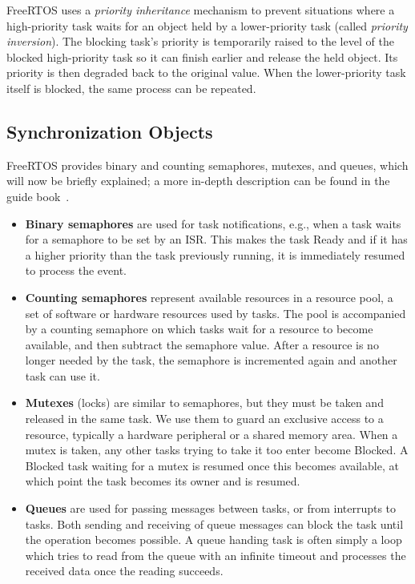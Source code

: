 FreeRTOS uses a \textit{priority inheritance} mechanism to prevent situations where a high-priority task waits for an object held by a lower-priority task (called \textit{priority inversion}). The blocking task's priority is temporarily raised to the level of the blocked high-priority task so it can finish earlier and release the held object. Its priority is then degraded back to the original value. When the lower-priority task itself is blocked, the same process can be repeated.

\subsection{Synchronization Objects}

FreeRTOS provides binary and counting semaphores, mutexes, and queues, which will now be briefly explained; a more in-depth description can be found in the guide book~\cite{freertos-book}.

\begin{itemize}
	\item \textbf{Binary semaphores} are used for task notifications, e.g., when a task waits for a semaphore to be set by an \gls{ISR}. This makes the task Ready and if it has a higher priority than the task previously running, it is immediately resumed to process the event.

	\item  \textbf{Counting semaphores} represent available resources in a resource pool, a set of software or hardware resources used by tasks. The pool is accompanied by a counting semaphore on which tasks wait for a resource to become available, and then subtract the semaphore value. After a resource is no longer needed by the task, the semaphore is incremented again and another task can use it.

	\item \textbf{Mutexes} (locks) are similar to semaphores, but they must be taken and released in the same task. We use them to
	guard an exclusive access to a resource, typically a hardware peripheral or a shared memory area. When a mutex is taken, any other tasks trying to take it too enter become Blocked. A Blocked task waiting for a mutex is resumed once this becomes available, at which point the task becomes its owner and is resumed.

	\item \textbf{Queues} are used for passing messages between tasks, or from interrupts to tasks. Both sending and receiving of queue messages can block the task until the operation becomes possible. A queue handing task is often simply a loop which tries to read from the queue with an infinite timeout and processes the received data once the reading succeeds.
\end{itemize}

